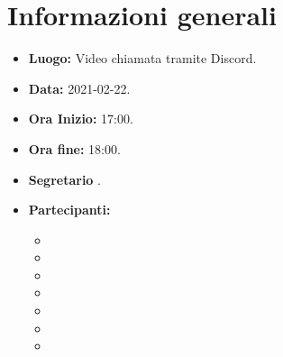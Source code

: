 \section{Informazioni generali}
	\begin{itemize}
		\item \textbf{Luogo:} Video chiamata tramite Discord.
		\item \textbf{Data:} 2021-02-22.
		\item \textbf{Ora Inizio:} 17:00.
		\item \textbf{Ora fine:} 18:00.
		\item \textbf{Segretario} \GB.
		\item \textbf{Partecipanti:}
		\begin{itemize}
			\item \MB
			\item \VAS
			\item \FD
			\item \NM
			\item \SB
			\item \GB
			\item \MDI
		\end{itemize}
		
	\end{itemize}